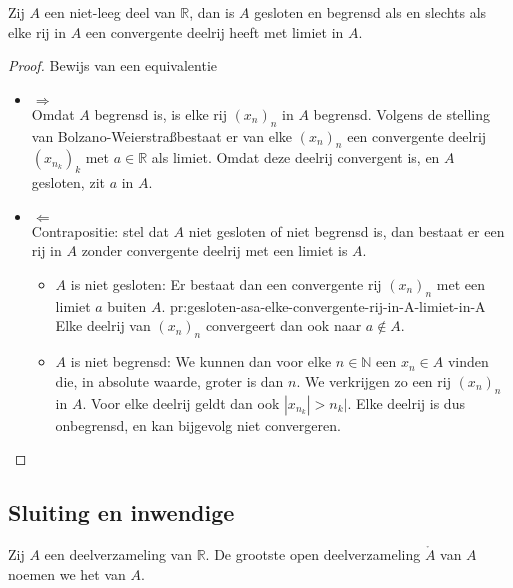 \documentclass[main.tex]{subfiles}
\begin{document}
\begin{pr}
  Zij $A$ een niet-leeg deel van $\mathbb{R}$, dan is $A$ gesloten en begrensd als en slechts als elke rij in $A$ een convergente deelrij heeft met limiet in $A$.

  \begin{proof}
    Bewijs van een equivalentie\\
    \begin{itemize}
    \item $\Rightarrow$\\
      Omdat $A$ begrensd is, is elke rij $(x_{n})_{n}$ in $A$ begrensd.
      Volgens de stelling van Bolzano-Weierstra\ss bestaat er van elke $(x_{n})_{n}$ een convergente deelrij $(x_{n_{k}})_{k}$ met $a \in \mathbb{R}$ als limiet.
      Omdat deze deelrij convergent is, en $A$ gesloten, zit $a$ in $A$.
      
    \item $\Leftarrow$\\
      Contrapositie: stel dat $A$ niet gesloten of niet begrensd is, dan bestaat er een rij in $A$ zonder convergente deelrij met een limiet is $A$.
      \begin{itemize}
      \item $A$ is niet gesloten:
        Er bestaat dan een convergente rij $(x_{n})_{n}$ met een limiet $a$ buiten $A$. {pr:gesloten-asa-elke-convergente-rij-in-A-limiet-in-A}
        Elke deelrij van $(x_{n})_{n}$ convergeert dan ook naar $a\not\in A$.
      \item $A$ is niet begrensd:
        We kunnen dan voor elke $n\in \mathbb{N}$ een $x_{n}\in A$ vinden die, in absolute waarde, groter is dan $n$.
        We verkrijgen zo een rij $(x_{n})_{n}$ in $A$.
        Voor elke deelrij geldt dan ook $|x_{n_{k}}| > n_{k}|$.
        Elke deelrij is dus onbegrensd, en kan bijgevolg niet convergeren.
      \end{itemize}
    \end{itemize}
  \end{proof}
\end{pr}

\subsection{Sluiting en inwendige}
\label{sec:sluit-en-inwend}

\begin{de}
  Zij $A$ een deelverzameling van $\mathbb{R}$.
  De grootste open deelverzameling $\mathring{A}$ van $A$ noemen we het  van $A$.
\end{de}
\end{document}
